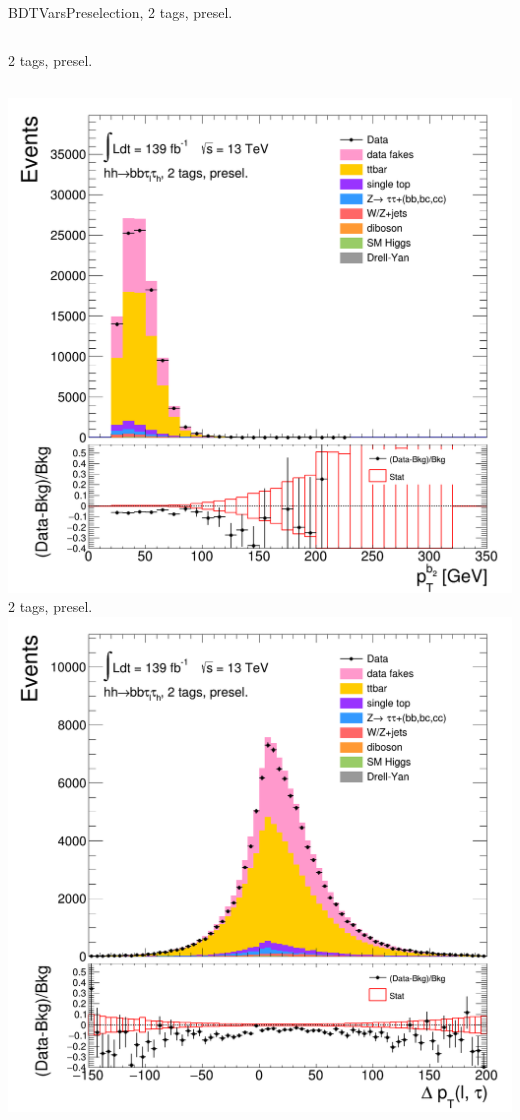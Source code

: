 \begin{frame}{BDTVarsPreselection, 2 tags, presel.}
\begin{columns}[c]
    2 tags, presel.
  \end{columns}
  \begin{columns}[c]
    \centering\includegraphics[width=\textwidth]{C_2tag2pjet_0ptv_pTB2}\\
    2 tags, presel.
    \centering\includegraphics[width=\textwidth]{C_2tag2pjet_0ptv_dPtLepTau}\\

\end{columns}
\end{frame}
